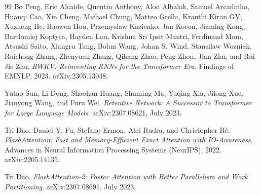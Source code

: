 \documentclass[11pt]{article}
\begin{document}
\begin{thebibliography}{99}
Bo Peng, Eric Alcaide, Quentin Anthony, Alon Albalak, Samuel Arcadinho, Huanqi Cao, Xin Cheng, Michael Chung, Matteo Grella, Kranthi Kiran GV, Xuzheng He, Haowen Hou, Przemyslaw Kazienko, Jan Kocon, Jiaming Kong, Bartlomiej Koptyra, Hayden Lau, Krishna Sri Ipsit Mantri, Ferdinand Mom, Atsushi Saito, Xiangru Tang, Bolun Wang, Johan S. Wind, Stansilaw Wozniak, Ruichong Zhang, Zhenyuan Zhang, Qihang Zhao, Peng Zhou, Jian Zhu, and Rui-Jie Zhu.
\textit{RWKV: Reinventing RNNs for the Transformer Era}.
Findings of EMNLP, 2023.
arXiv:2305.13048.

Yutao Sun, Li Dong, Shaohan Huang, Shuming Ma, Yuqing Xia, Jilong Xue, Jianyong Wang, and Furu Wei.
\textit{Retentive Network: A Successor to Transformer for Large Language Models}.
arXiv:2307.08621, July 2023.

Tri Dao, Daniel Y. Fu, Stefano Ermon, Atri Rudra, and Christopher R\'e.
\textit{FlashAttention: Fast and Memory-Efficient Exact Attention with IO-Awareness}.
Advances in Neural Information Processing Systems (NeurIPS), 2022.
arXiv:2205.14135.

Tri Dao.
\textit{FlashAttention-2: Faster Attention with Better Parallelism and Work Partitioning}.
arXiv:2307.08691, July 2023.

\end{thebibliography}
\end{document}
